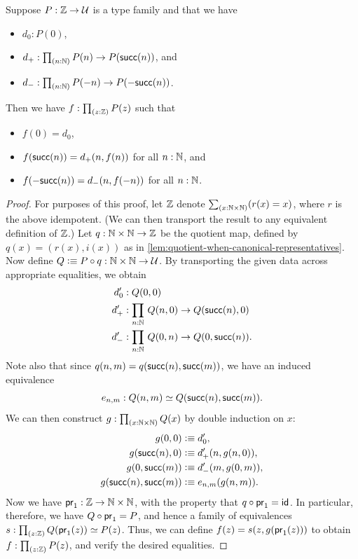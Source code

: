 \begin{lem}\label{thm:sign-induction}
  Suppose $P:\mathbb{Z}\to\mathcal{U}$ is a type family and that we have
  \begin{itemize}
  \item $d_0: P(0)$,
  \item $d_+: \prd{n:\N} P(n) \to P(\suc(n))$, and
  \item $d_- : \prd{n:\N} P(-n) \to P(-\suc(n))$.
  \end{itemize}
  Then we have $f:\prd{z:\Z} P(z)$ such that
  \begin{itemize}
    \item $f(0) = d_0$,
    \item $f(\mathsf{succ}(n)) = d_+(n,f(n))$ for all $n:\mathbb{N}$, and
    \item $f(-\mathsf{succ}(n)) = d_-(n,f(-n))$ for all $n:\mathbb{N}$.
  \end{itemize}
\end{lem}
\begin{proof}
  For purposes of this proof, let $\mathbb{Z}$ denote $\sm{x:\N\times\N}(r(x)=x)$, where $r$ is the above idempotent.
  (We can then transport the result to any equivalent definition of $\mathbb{Z}$.)
  Let $q:\mathbb{N}\times\mathbb{N}\to\mathbb{Z}$ be the quotient map, defined by $q(x) = (r(x),i(x))$ as in \cref{lem:quotient-when-canonical-representatives}.
  Now define $Q\vcentcolon\equiv P\circ q:\mathbb{N}\times \mathbb{N} \to \mathcal{U}$.
  By transporting the given data across appropriate equalities, we obtain
  \begin{align*}
    d'_0 &: Q(0,0)\\
    d'_+ &: \prd{n:\N} Q(n,0) \to Q(\suc(n),0)\\
    d'_- &: \prd{n:\N} Q(0,n) \to Q(0,\suc(n)).
  \end{align*}
  Note also that since $q(n,m) = q(\mathsf{succ}(n),\mathsf{succ}(m))$, we have an induced equivalence
  \[e_{n,m}:Q(n,m) \simeq Q(\mathsf{succ}(n),\mathsf{succ}(m)).\]
  We can then construct $g:\prd{x:\N\times \N} Q(x)$ by double induction on $x$:
  \begin{align*}
    g(0,0) &\vcentcolon\equiv d'_0,\\
    g(\mathsf{succ}(n),0) &\vcentcolon\equiv d'_+(n,g(n,0)),\\
    g(0,\mathsf{succ}(m)) &\vcentcolon\equiv d'_-(m,g(0,m)),\\
    g(\mathsf{succ}(n),\mathsf{succ}(m)) &\vcentcolon\equiv e_{n,m}(g(n,m)).
  \end{align*}
  Now we have $\mathsf{pr}_{1} : \mathbb{Z} \to \mathbb{N}\times\mathbb{N}$, with the property that $q\circ \mathsf{pr}_{1} = \mathsf{id}_{}$.
  In particular, therefore, we have $Q\circ \mathsf{pr}_{1} = P$, and hence a family of equivalences $s:\prd{z:\Z} \eqv{Q(\proj1(z))}{P(z)}$.
  Thus, we can define $f(z) = s(z,g(\mathsf{pr}_{1}(z)))$ to obtain $f:\prd{z:\Z} P(z)$, and verify the desired equalities.
\end{proof}

